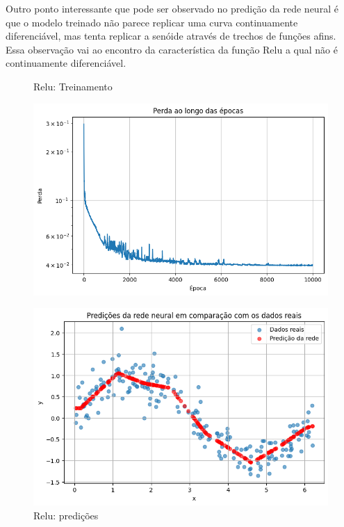 Outro ponto interessante que pode ser observado no predição da rede neural é que o modelo treinado não parece replicar uma curva continuamente diferenciável, mas tenta replicar a senóide através de trechos de funções afins. Essa observação vai ao encontro da característica da função Relu a qual não é continuamente diferenciável.

\begin{figure}[htb]
	\centering
	\begin{minipage}{0.45\textwidth}
	\centering
	\caption{Relu: Treinamento} \label{tarefa01:relu:treinamento}
	\includegraphics[width=\textwidth]{./0803_imgs/png-241110-145116395-16963719957492600077.png}
	\end{minipage}
	\hfill
	\begin{minipage}{0.45\textwidth}
	\centering
	\caption{Relu: predições} \label{tarefa01:relu:predicoes}
	\includegraphics[width=\textwidth]{./0803_imgs/png-241111-212509484-7783840008639668300.png}
	\end{minipage}
\end{figure}

